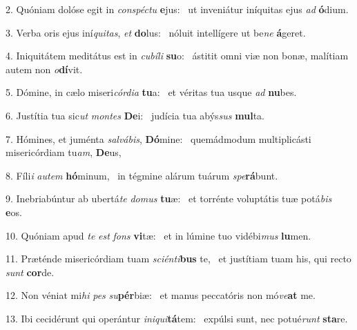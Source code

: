 2. Quóniam dolóse egit in \textit{con}\textit{spéc}\textit{tu} \textbf{e}jus: \ast\  ut inveniátur iníquitas ejus \textit{ad} \textbf{ó}dium.\

3. Verba oris ejus iní\textit{qui}\textit{tas}, \textit{et} \textbf{do}lus: \ast\  nóluit intellígere ut be\textit{ne} \textbf{á}geret.\

4. Iniquitátem meditátus est in \textit{cu}\textit{bí}\textit{li} \textbf{su}o: \ast\  ástitit omni viæ non bonæ, malítiam autem non \textit{o}\textbf{dí}vit.\

5. Dómine, in cælo miseri\textit{cór}\textit{di}\textit{a} \textbf{tu}a: \ast\  et véritas tua usque \textit{ad} \textbf{nu}bes.\

6. Justítia tua sic\textit{ut} \textit{mon}\textit{tes} \textbf{De}i: \ast\  judícia tua abýs\textit{sus} \textbf{mul}ta.\

7. Hómines, et juménta \textit{sal}\textit{vá}\textit{bis}, \textbf{Dó}mine: \ast\  quemádmodum multiplicásti misericórdiam tu\textit{am}, \textbf{De}us,\

8. Fíli\textit{i} \textit{au}\textit{tem} \textbf{hó}minum, \ast\  in tégmine alárum tuárum \textit{spe}\textbf{rá}bunt.\

9. Inebriabúntur ab ubertá\textit{te} \textit{do}\textit{mus} \textbf{tu}æ: \ast\  et torrénte voluptátis tuæ potá\textit{bis} \textbf{e}os.\

10. Quóniam apud \textit{te} \textit{est} \textit{fons} \textbf{vi}tæ: \ast\  et in lúmine tuo vidébi\textit{mus} \textbf{lu}men.\

11. Præténde misericórdiam tuam \textit{sci}\textit{én}\textit{ti}\textbf{bus} te, \ast\  et justítiam tuam his, qui recto \textit{sunt} \textbf{cor}de.\

12. Non véniat mi\textit{hi} \textit{pes} \textit{su}\textbf{pér}biæ: \ast\  et manus peccatóris non mó\textit{ve}\textbf{at} me.\

13. Ibi cecidérunt qui operántur \textit{in}\textit{i}\textit{qui}\textbf{tá}tem: \ast\  expúlsi sunt, nec potué\textit{runt} \textbf{sta}re.\

